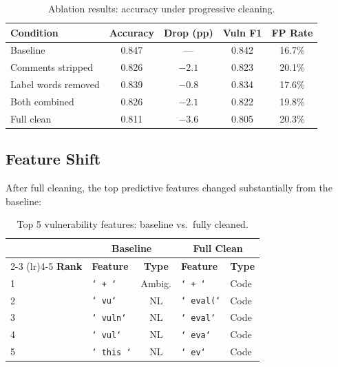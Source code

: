 \documentclass[11pt,a4paper]{article}
\begin{document}
\begin{table}[H]
\centering
\caption{Ablation results: accuracy under progressive cleaning.}
\label{tab:ablation}
\begin{tabular}{lcccc}
\toprule
\textbf{Condition} & \textbf{Accuracy} & \textbf{Drop (pp)} & \textbf{Vuln F1} & \textbf{FP Rate} \\
\midrule
Baseline & 0.847 & --- & 0.842 & 16.7\% \\
Comments stripped & 0.826 & $-2.1$ & 0.823 & 20.1\% \\
Label words removed & 0.839 & $-0.8$ & 0.834 & 17.6\% \\
Both combined & 0.826 & $-2.1$ & 0.822 & 19.8\% \\
Full clean & 0.811 & $-3.6$ & 0.805 & 20.3\% \\
\bottomrule
\end{tabular}
\end{table}

\subsection{Feature Shift}

After full cleaning, the top predictive features changed substantially from the baseline:

\begin{table}[H]
\centering
\caption{Top 5 vulnerability features: baseline vs.\ fully cleaned.}
\begin{tabular}{llcll}
\toprule
& \multicolumn{2}{c}{\textbf{Baseline}} & \multicolumn{2}{c}{\textbf{Full Clean}} \\
\cmidrule(lr){2-3} \cmidrule(lr){4-5}
\textbf{Rank} & \textbf{Feature} & \textbf{Type} & \textbf{Feature} & \textbf{Type} \\
\midrule
1 & \texttt{` + `} & Ambig. & \texttt{` + `} & Code \\
2 & \texttt{` vu`} & NL & \texttt{` eval(`} & Code \\
3 & \texttt{` vuln`} & NL & \texttt{` eval`} & Code \\
4 & \texttt{` vul`} & NL & \texttt{` eva`} & Code \\
5 & \texttt{` this `} & NL & \texttt{` ev`} & Code \\
\bottomrule
\end{tabular}
\end{table}
\end{document}

